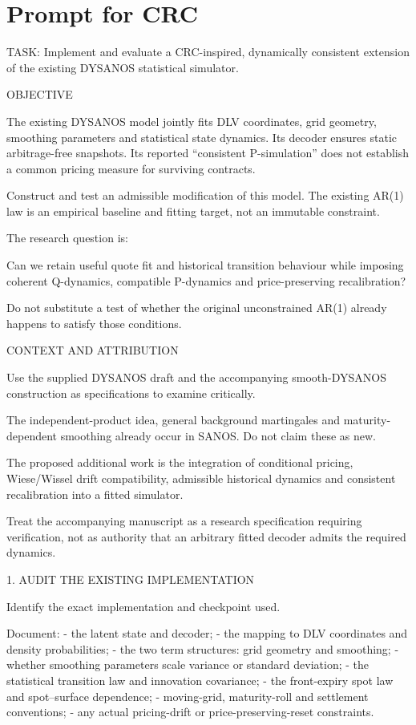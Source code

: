 \documentclass[11pt,a4paper]{article}
\numberwithin{equation}{section}
\theoremstyle{definition}\newtheorem{definition}[theorem]{Definition}
\theoremstyle{remark}\newtheorem{remark}[theorem]{Remark}
\begin{document}
\section{Prompt for CRC}
TASK: Implement and evaluate a CRC-inspired, dynamically consistent
extension of the existing DYSANOS statistical simulator.

OBJECTIVE

The existing DYSANOS model jointly fits DLV coordinates, grid geometry,
smoothing parameters and statistical state dynamics. Its decoder ensures
static arbitrage-free snapshots. Its reported “consistent P-simulation”
does not establish a common pricing measure for surviving contracts.

Construct and test an admissible modification of this model. The existing
AR(1) law is an empirical baseline and fitting target, not an immutable
constraint.

The research question is:

Can we retain useful quote fit and historical transition behaviour while
imposing coherent Q-dynamics, compatible P-dynamics and price-preserving
recalibration?

Do not substitute a test of whether the original unconstrained AR(1)
already happens to satisfy those conditions.

CONTEXT AND ATTRIBUTION

Use the supplied DYSANOS draft and the accompanying smooth-DYSANOS
construction as specifications to examine critically.

The independent-product idea, general background martingales and
maturity-dependent smoothing already occur in SANOS. Do not claim these
as new.

The proposed additional work is the integration of conditional pricing,
Wiese/Wissel drift compatibility, admissible historical dynamics and
consistent recalibration into a fitted simulator.

Treat the accompanying manuscript as a research specification requiring
verification, not as authority that an arbitrary fitted decoder admits
the required dynamics.

1. AUDIT THE EXISTING IMPLEMENTATION

Identify the exact implementation and checkpoint used.

Document:
- the latent state and decoder;
- the mapping to DLV coordinates and density probabilities;
- the two term structures: grid geometry and smoothing;
- whether smoothing parameters scale variance or standard deviation;
- the statistical transition law and innovation covariance;
- the front-expiry spot law and spot–surface dependence;
- moving-grid, maturity-roll and settlement conventions;
- any actual pricing-drift or price-preserving-reset constraints.
\end{document}
